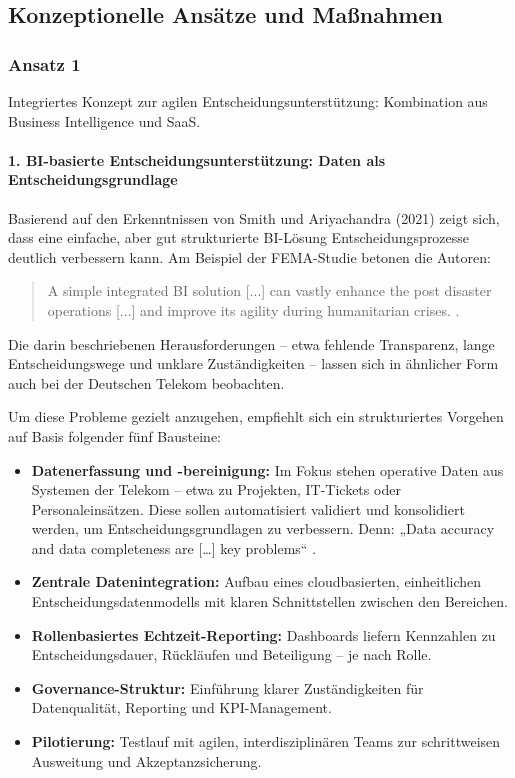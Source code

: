 \documentclass[12pt,a4paper]{article}
\begin{document}
\subsection{Konzeptionelle Ansätze und Maßnahmen}
\subsubsection{Ansatz 1}
Integriertes Konzept zur agilen Entscheidungsunterstützung: Kombination aus Business Intelligence und SaaS.


\paragraph{1. BI-basierte Entscheidungsunterstützung: Daten als Entscheidungsgrundlage}
Basierend auf den Erkenntnissen von Smith und Ariyachandra (2021) zeigt sich, dass eine einfache, aber gut strukturierte BI-Lösung Entscheidungsprozesse deutlich verbessern kann. Am Beispiel der FEMA-Studie betonen die Autoren:

\begin{quote}
	A simple integrated BI solution [...] can vastly enhance the post disaster operations [...] and improve its agility during humanitarian crises. \parencite[210]{rahman_achieving_2022}.
\end{quote} 


\noindent Die darin beschriebenen Herausforderungen – etwa fehlende Transparenz, lange Entscheidungswege und unklare Zuständigkeiten – lassen sich in ähnlicher Form auch bei der Deutschen Telekom beobachten. 

\noindent Um diese Probleme gezielt anzugehen, empfiehlt sich ein strukturiertes Vorgehen auf Basis folgender fünf Bausteine:

\begin{itemize}
\item \textbf{Datenerfassung und -bereinigung:} Im Fokus stehen operative Daten aus Systemen der Telekom – etwa zu Projekten, IT-Tickets oder Personaleinsätzen. Diese sollen automatisiert validiert und konsolidiert werden, um Entscheidungsgrundlagen zu verbessern. Denn: „Data accuracy and data completeness are […] key problems“ \parencite[S.~201]{rahman_achieving_2022}.


	\item \textbf{Zentrale Datenintegration:} Aufbau eines cloudbasierten, einheitlichen Entscheidungsdatenmodells mit klaren Schnittstellen zwischen den Bereichen.
	\item \textbf{Rollenbasiertes Echtzeit-Reporting:} Dashboards liefern Kennzahlen zu Entscheidungsdauer, Rückläufen und Beteiligung – je nach Rolle.
	\item \textbf{Governance-Struktur:} Einführung klarer Zuständigkeiten für Datenqualität, Reporting und KPI-Management.
	\item \textbf{Pilotierung:} Testlauf mit agilen, interdisziplinären Teams zur schrittweisen Ausweitung und Akzeptanzsicherung.
\end{itemize}
\end{document}
